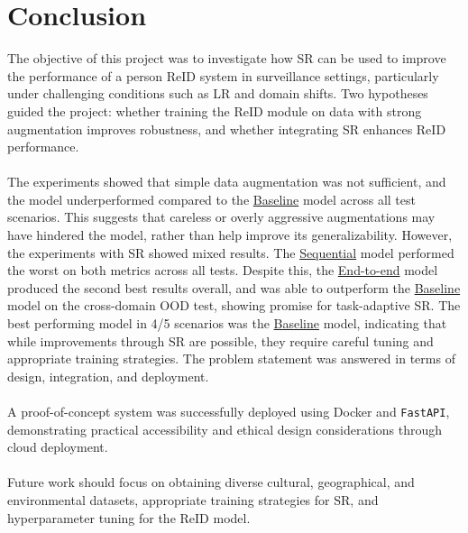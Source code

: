 \chapter{Conclusion} \label{cha:conclusion}

The objective of this project was to investigate how \acf{SR} can be used to improve the performance of a person \acf{ReID} system in surveillance settings, particularly under challenging conditions such as \acf{LR} and domain shifts. Two hypotheses guided the project: whether training the \acs{ReID} module on data with strong augmentation improves robustness, and whether integrating \acs{SR} enhances \acs{ReID} performance.
\\\\
The experiments showed that simple data augmentation was not sufficient, and the model underperformed compared to the \hyperlink{model:baseline}{Baseline} model across all test scenarios. This suggests that careless or overly aggressive augmentations may have hindered the model, rather than help improve its generalizability. However, the experiments with \acs{SR} showed mixed results. The \hyperlink{model:sequential}{Sequential} model performed the worst on both metrics across all tests. Despite this, the \hyperlink{model:endtoend}{End-to-end} model produced the second best results overall, and was able to outperform the \hyperlink{model:baseline}{Baseline} model on the cross-domain \acs{OOD} test, showing promise for task-adaptive \acs{SR}.
The best performing model in 4/5 scenarios was the \hyperlink{model:baseline}{Baseline} model, indicating that while improvements through \acs{SR} are possible, they require careful tuning and appropriate training strategies. The problem statement was answered in terms of design, integration, and deployment.
\\\\
A proof-of-concept system was successfully deployed using Docker and \texttt{FastAPI}, demonstrating practical accessibility and ethical design considerations through cloud deployment.
\\\\
Future work should focus on obtaining diverse cultural, geographical, and environmental datasets, appropriate training strategies for \acs{SR}, and hyperparameter tuning for the \acs{ReID} model. 


